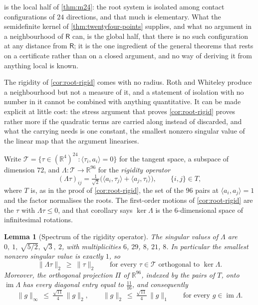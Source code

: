 \documentclass[11pt,reqno]{amsart}
\renewcommand{\_}{\origunderscore\allowbreak}
\numberwithin{equation}{section}
\theoremstyle{plain}
\newtheorem{lem}[thm]{Lemma}
\theoremstyle{definition}
\theoremstyle{remark}
\newcommand{\Rt}{\mathsf{R}}                 %
\begin{document}
 is the local half of \cref{thm:m24}: the root
system is isolated among contact configurations of $24$ directions, and
that much is elementary. What the semidefinite kernel of
\cref{thm:twentyfour-points} supplies, and what no argument in a
neighbourhood of $\Rt$ can, is the global half, that there is no such
configuration at any distance from $\Rt$; it is the one ingredient of
the general theorems that rests on a certificate rather than on a
closed argument, and no way of deriving it from anything local is
known.

The rigidity of \cref{cor:root-rigid} comes with no radius. Roth and
Whiteley produce a neighbourhood but not a measure of it, and a
statement of isolation with no number in it cannot be combined with
anything quantitative. It can be made explicit at little cost: the stress
argument that proves \cref{cor:root-rigid} proves rather more if the
quadratic terms are carried along instead of discarded, and what the
carrying needs is one constant, the smallest nonzero singular value of
the linear map that the argument linearises.

Write $\mathcal{T}=\{\tau\in(\mathbb{R}^4)^{24}:\langle\tau_i,a_i\rangle=0\}$ for the
tangent space, a subspace of dimension $72$, and
$\Lambda\colon\mathcal{T}\to\mathbb{R}^{96}$ for the \emph{rigidity operator}
\begin{equation}\label{eq:rigidity-operator}
  (\Lambda\tau)_{ij}
  =\tfrac1{\sqrt2}\bigl(\langle a_i,\tau_j\rangle+\langle a_j,\tau_i\rangle\bigr),
  \qquad \{i,j\}\in T,
\end{equation}
where $T$ is, as in the proof of \cref{cor:root-rigid}, the set of
the $96$ pairs at $\langle a_i,a_j\rangle=1$ and the factor normalises the
roots. The first-order motions of
\cref{cor:root-rigid} are the $\tau$ with $\Lambda\tau\le0$, and that
corollary says $\ker\Lambda$ is the $6$-dimensional space of
infinitesimal rotations.

\begin{lem}[Spectrum of the rigidity operator]\label{lem:rigidity-spectrum}
The singular values of $\Lambda$ are
$0,\ 1,\ \sqrt{5/2},\ \sqrt3,\ 2$, with multiplicities
$6$, $29$, $8$, $21$, $8$. In particular the smallest nonzero singular
value is exactly $1$, so
\begin{equation}\label{eq:sigma-one}
  \|\Lambda\tau\|_2\ \ge\ \|\tau\|_2
  \qquad\text{for every } \tau\in\mathcal{T} \text{ orthogonal to } \ker\Lambda .
\end{equation}
Moreover, the orthogonal projection $\Pi$ of $\mathbb{R}^{96}$, indexed by the
pairs of $T$, onto $\operatorname{im}\Lambda$ has every diagonal entry equal to
$\tfrac{11}{16}$, and consequently
\begin{equation}\label{eq:image-linf}
  \|g\|_\infty\ \le\ \tfrac{\sqrt{11}}{4}\,\|g\|_2,
  \qquad
  \|g\|_2\ \le\ \tfrac{\sqrt{11}}{4}\,\|g\|_1
  \qquad\text{for every } g\in\operatorname{im}\Lambda .
\end{equation}
\end{lem}
\end{document}
